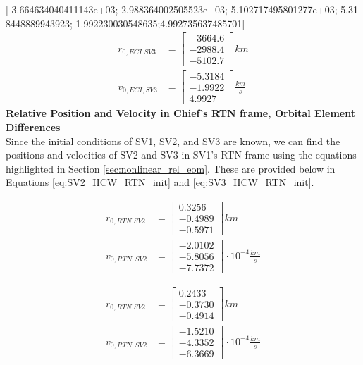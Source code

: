 [-3.664634040411143e+03;-2.988364002505523e+03;-5.102717495801277e+03;-5.318448889943923;-1.992230030548635;4.992735637485701]
\begin{align} \label{eq:SV3_HCW1_ECI_initial}
    r_{0, ECI. SV3} &= \begin{bmatrix}
        -3664.6 \\
        -2988.4 \\
        -5102.7
    \end{bmatrix} km \\
    v_{0, ECI, SV3} &= \begin{bmatrix}
        -5.3184 \\
        -1.9922 \\
        4.9927
    \end{bmatrix} \frac{km}{s}
\end{align}
\textbf{Relative Position and Velocity in Chief's RTN frame, Orbital Element Differences} \\
Since the initial conditions of SV1, SV2, and SV3 are known, we can find the positions and velocities of SV2 and SV3 in SV1's RTN frame using the equations highlighted in Section \ref{sec:nonlinear_rel_eom}. These are provided below in Equations \ref{eq:SV2_HCW_RTN_init} and \ref{eq:SV3_HCW_RTN_init}.

\begin{align} \label{eq:SV2_HCW_RTN_init}
    r_{0, RTN. SV2} &= \begin{bmatrix}
        0.3256 \\
        -0.4989 \\
        -0.5971
    \end{bmatrix} km \\
    v_{0, RTN, SV2} &= \begin{bmatrix}
        -2.0102 \\
        -5.8056 \\
        -7.7372
    \end{bmatrix}\cdot 10^{-4} \frac{km}{s}
\end{align}

\begin{align} \label{eq:SV3_HCW_RTN_init}
    r_{0, RTN. SV2} &= \begin{bmatrix}
        0.2433 \\
        -0.3730 \\
        -0.4914
    \end{bmatrix} km \\
    v_{0, RTN, SV2} &= \begin{bmatrix}
        -1.5210 \\
        -4.3352 \\
        -6.3669
    \end{bmatrix}\cdot 10^{-4} \frac{km}{s}
\end{align}


